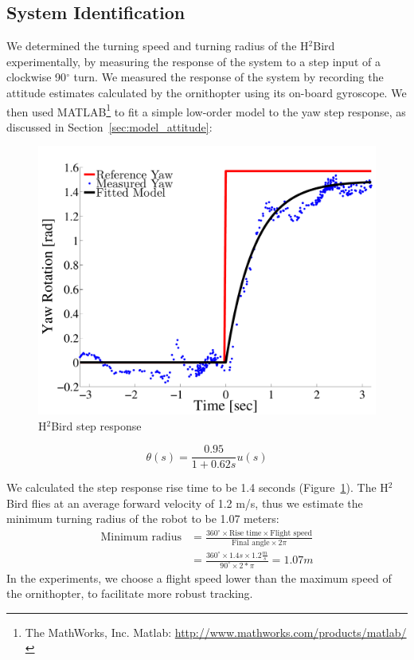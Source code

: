 \documentclass{aamas2013}
\begin{document}
\subsection{System Identification}
\label{sec:system_id}

We determined the turning speed and turning radius of the H$^2$Bird 
experimentally, by measuring the response of the system to a step input of a 
clockwise 90$^{\circ}$ turn. We measured the response of the system by 
recording the attitude estimates calculated by the ornithopter using its 
on-board gyroscope. We then used MATLAB\footnote{\raggedright The MathWorks, Inc. Matlab:
\href{http://www.mathworks.com/products/matlab/}
     {http://www.mathworks.com/products/matlab/}} 
to fit a simple low-order model to the yaw step response, as discussed in 
Section~\ref{sec:model_attitude}:

\begin{figure}[tb]
\centering
\includegraphics[width=\linewidth]{figures/step_response_total.pdf}
\caption{H$^2$Bird step response}
\label{fig:step_response}
\end{figure}


\begin{equation}
\label{eq:transfer_func}
\theta(s) = \frac{0.95}{1+0.62s}u(s)
\end{equation}

We calculated the step response rise time to be 1.4 seconds (Figure~\ref{fig:step_response}). The H$^2$Bird flies at an 
average forward velocity of 1.2 m/s, thus we estimate 
the minimum turning radius of the robot to be 1.07 meters:
\begin{equation}
\label{eq:min_radius}
\begin{aligned}
\text{Minimum radius} & = \frac{360^{\circ}\times\text{Rise time}\times\text{Flight
speed}}{\text{Final angle}\times 2\pi}\\
& = \frac{360^{\circ}\times 1.4s\times 1.2\frac{m}{s}}{90^{\circ}\times2*\pi} = 1.07 m
\end{aligned}
\end{equation}
In the experiments, we choose a flight speed lower 
than the maximum speed of the ornithopter, to facilitate more robust 
tracking.
\end{document}

